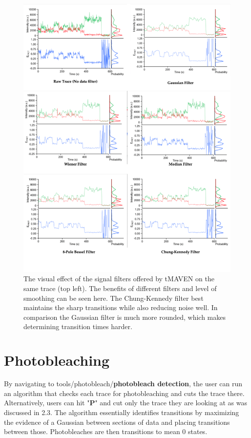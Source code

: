 \documentclass[11pt,a5paper,footinclude=true,headinclude=true]{scrbook} %
\begin{document}
    \begin{figure}
        \centering
        \includegraphics[scale=0.35]{tMAVEN filters Diagram.jpg}
        \caption{The visual effect of the signal filters offered by tMAVEN on the same trace (top left). The benefits of different filters and level of smoothing can be seen here. The Chung-Kennedy filter best maintains the sharp transitions while also reducing noise well. In comparison the Gaussian filter is much more rounded, which makes determining transition times harder.}
        \label{fig:my_label}
    \end{figure}
\section{Photobleaching}
By navigating to tools/photobleach/\textbf{photobleach detection}, the user can run an algorithm that checks each trace for photobleaching and cuts the trace there. Alternatively, users can hit "\textbf{P}" and cut only the trace they are looking at as was discussed in 2.3. The algorithm essentially identifies transitions by maximizing the evidence of a Gaussian between sections of data and placing transitions between those. Photobleaches are then transitions to mean 0 states. 
\end{document}
